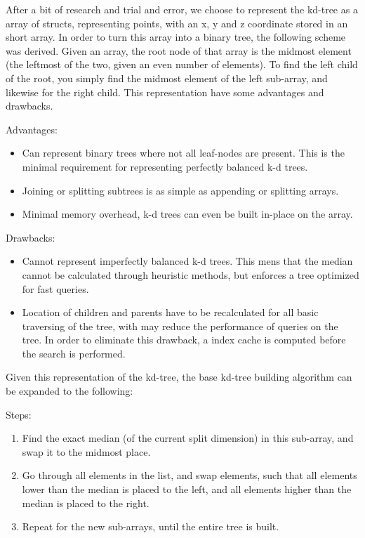 After a bit of research and trial and error, we choose to represent the kd-tree as a array of structs, representing points, with an x, y and z coordinate stored in an short array. In order to turn this array into a binary tree, the following scheme was derived. Given an array, the root node of that array is the midmost element (the leftmost of the two, given an even number of elements). To find the left child of the root, you simply find the midmost element of the left sub-array, and likewise for the right child. This representation have some advantages and drawbacks.

Advantages:
\begin{itemize}
    \item Can represent binary trees where not all leaf-nodes are present. This is the minimal requirement for representing perfectly balanced k-d trees.
    \item Joining or splitting subtrees is as simple as appending or splitting arrays.
    \item Minimal memory overhead, k-d trees can even be built in-place on the array.
\end{itemize}

Drawbacks:
\begin{itemize}
    \item Cannot represent imperfectly balanced k-d trees. This mens that the median cannot be calculated through heuristic methods, but enforces a tree optimized for fast queries.
    \item Location of children and parents have to be recalculated for all basic traversing of the tree, with may reduce the performance of queries on the tree. In order to eliminate this drawback, a index cache is computed before the search is performed.
\end{itemize}

Given this representation of the kd-tree, the base kd-tree building algorithm can be expanded to the following:

Steps:
\begin{enumerate}
    \item Find the exact median (of the current split dimension) in this sub-array, and swap it to the midmost place.
    \item Go through all elements in the list, and swap elements, such that all elements lower than the median is placed to the left, and all elements higher than the median is placed to the right.
    \item Repeat for the new sub-arrays, until the entire tree is built.
\end{enumerate}

